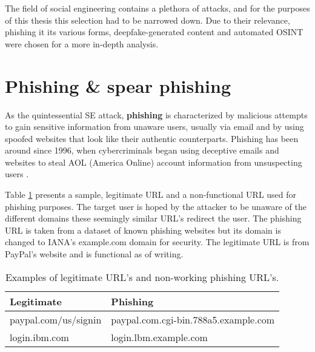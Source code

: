The field of social engineering contains a plethora of attacks, and for the purposes of this thesis this selection had to be narrowed down. Due to their relevance, phishing it its various forms, deepfake-generated content and automated OSINT were chosen for a more in-depth analysis.










\section{Phishing \& spear phishing}
\begin{comment}
    
    - 

\end{comment}


As the quintessential SE attack, \textbf{phishing} is characterized by malicious attempts to gain sensitive information from unaware users, usually via email and by using spoofed websites that look like their authentic counterparts. Phishing has been around since 1996, when cybercriminals began using deceptive emails and websites to steal AOL (America Online) account information from unsuspecting users \citep{wangDefiningSocialEngineering2020}.


Table \ref{tab:placeholder_label} presents a sample, legitimate URL and a non-functional URL used for phishing purposes. The target user is hoped by the attacker to be unaware of the different domains these seemingly similar URL's redirect the user. The phishing URL is taken from a dataset of known phishing websites but its domain is changed to IANA's example.com domain for security. The legitimate URL is from PayPal's website and is functional as of writing.

\begin{table}[h]
    \centering
    \begin{tabular}{|l|l|}
        \hline
        \textbf{Legitimate} & \textbf{Phishing} \\ \hline
        paypal.com/us/signin &paypal.com.cgi-bin.788a5.example.com \\ \hline
        login.ibm.com & login.lbm.example.com \\ \hline
        
    \end{tabular}
    \caption{Examples of legitimate URL's and non-working phishing URL's.}
    \label{tab:placeholder_label}
\end{table}

